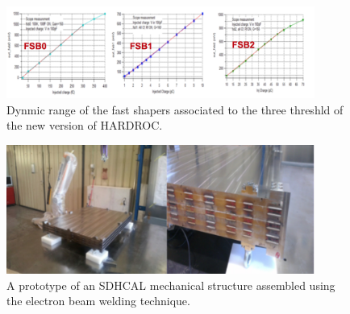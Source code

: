 \begin{figure}
\centering
\includegraphics[width=0.90\textwidth]{Calorimeter/SDHCAL_GRPC/figures/fsb.png}
\caption{Dynmic range of the fast shapers associated to the three threshld of the new version of HARDROC.}\label{fig:Calorimeter:SDHCAL_GRPC:FSB}
\end{figure}

\begin{figure}
\centering
\includegraphics[width=0.90\textwidth]{Calorimeter/SDHCAL_GRPC/figures/EBW.png}
\caption{A prototype of an SDHCAL mechanical structure assembled using the electron beam welding technique.}\label{fig:Calorimeter:SDHCAL_GRPC:EBW}
\end{figure}
